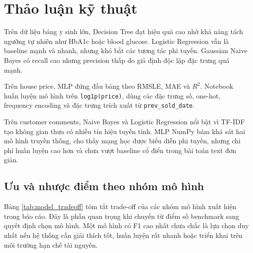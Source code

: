 \documentclass[12pt,a4paper]{report}
\begin{document}
\section{Thảo luận kỹ thuật}
Trên dữ liệu bảng y sinh lớn, Decision Tree đạt hiệu quả cao nhờ khả năng tách ngưỡng tự nhiên như HbA1c hoặc blood glucose. Logistic Regression vẫn là baseline mạnh và nhanh, nhưng khó bắt các tương tác phi tuyến. Gaussian Naive Bayes có recall cao nhưng precision thấp do giả định độc lập đặc trưng quá mạnh.

Trên house price, MLP đứng đầu bảng theo RMSLE, MAE và $R^2$. Notebook huấn luyện mô hình trên \texttt{log1p(price)}, dùng các đặc trưng số, one-hot, frequency encoding và đặc trưng trích xuất từ \texttt{prev\_sold\_date}.

Trên customer comments, Naive Bayes và Logistic Regression nổi bật vì TF-IDF tạo không gian thưa có nhiều tín hiệu tuyến tính. MLP NumPy bám khá sát hai mô hình truyền thống, cho thấy mạng học được biểu diễn phi tuyến, nhưng chi phí huấn luyện cao hơn và chưa vượt baseline cổ điển trong bài toán text đơn giản.

\subsection{Ưu và nhược điểm theo nhóm mô hình}
Bảng \ref{tab:model_tradeoff} tóm tắt trade-off của các nhóm mô hình xuất hiện trong báo cáo.
Đây là phần quan trọng khi chuyển từ điểm số benchmark sang quyết định chọn mô hình.
Một mô hình có F1 cao nhất chưa chắc là lựa chọn duy nhất nếu hệ thống cần giải thích tốt, huấn luyện rất nhanh hoặc triển khai trên môi trường hạn chế tài nguyên.

\begin{table}[H]
\centering
\caption{Ưu và nhược điểm của các nhóm mô hình trong Assignment 03}
\label{tab:model_tradeoff}
\end{table}
\end{document}
